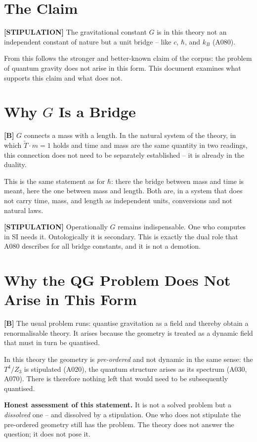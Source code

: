 \section{The Claim}

\textbf{[STIPULATION]} The gravitational constant $G$ is in this theory not an
independent constant of nature but a unit bridge -- like $c$, $\hbar$, and $k_B$
(A080).

From this follows the stronger and better-known claim of the corpus: the problem of
quantum gravity does not arise in this form. This document examines what supports
this claim and what does not.

\section{Why $G$ Is a Bridge}

\textbf{[B]} $G$ connects a mass with a length. In the natural system of the
theory, in which $\tilde T\cdot m = 1$ holds and time and mass are the same
quantity in two readings, this connection does not need to be separately
established -- it is already in the duality.

This is the same statement as for $\hbar$: there the bridge between mass and time
is meant, here the one between mass and length. Both are, in a system that does not
carry time, mass, and length as independent units, conversions and not natural laws.

\textbf{[STIPULATION]} Operationally $G$ remains indispensable. One who computes
in SI needs it. Ontologically it is secondary. This is exactly the dual role that
A080 describes for all bridge constants, and it is not a demotion.

\section{Why the QG Problem Does Not Arise in This Form}

\textbf{[B]} The usual problem runs: quantise gravitation as a field and thereby
obtain a renormalisable theory. It arises because the geometry is treated as a
dynamic field that must in turn be quantised.

In this theory the geometry is \emph{pre-ordered} and not dynamic in the same
sense: the $T^4/Z_3$ is stipulated (A020), the quantum structure arises as its
spectrum (A030, A070). There is therefore nothing left that would need to be
subsequently quantised.

\textbf{Honest assessment of this statement.} It is not a solved problem but a
\emph{dissolved} one -- and dissolved by a stipulation. One who does not stipulate
the pre-ordered geometry still has the problem. The theory does not answer the
question; it does not pose it.

